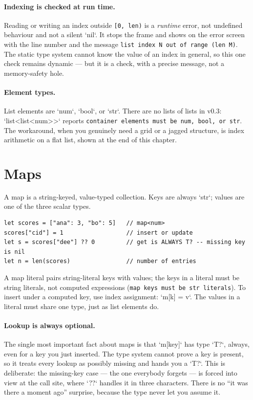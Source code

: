\paragraph{Indexing is checked at run time.} Reading or writing an index
outside \texttt{[0, len)} is a \emph{runtime} error, not undefined behaviour
and not a silent `nil`. It stops the frame and shows on the error screen with
the line number and the message \texttt{list index N out of range (len M)}.
The static type system cannot know the value of an index in general, so this
one check remains dynamic --- but it is a check, with a precise message, not a
memory-safety hole.

\paragraph{Element types.} List elements are `num`, `bool`, or `str`. There
are no lists of lists in v0.3: `list<list<num>>` reports
\texttt{container elements must be num, bool, or str}. The workaround, when
you genuinely need a grid or a jagged structure, is index arithmetic on a flat
list, shown at the end of this chapter.

\section{Maps}

A map is a string-keyed, value-typed collection. Keys are always `str`;
values are one of the three scalar types.

\begin{lstlisting}[language=wick]
let scores = ["ana": 3, "bo": 5]   // map<num>
scores["cid"] = 1                  // insert or update
let s = scores["dee"] ?? 0         // get is ALWAYS T? -- missing key is nil
let n = len(scores)                // number of entries
\end{lstlisting}

\noindent
A map literal pairs string-literal keys with values; the keys in a literal
must be string literals, not computed expressions
(\texttt{map keys must be str literals}). To insert under a computed key, use
index assignment: `m[k] = v`. The values in a literal must share one type,
just as list elements do.

\paragraph{Lookup is always optional.} The single most important fact about
maps is that `m[key]` has type `T?`, always, even for a key you just inserted.
The type system cannot prove a key is present, so it treats every lookup as
possibly missing and hands you a `T?`. This is deliberate: the missing-key
case --- the one everybody forgets --- is forced into view at the call site,
where `??` handles it in three characters. There is no ``it was there a moment
ago'' surprise, because the type never let you assume it.

